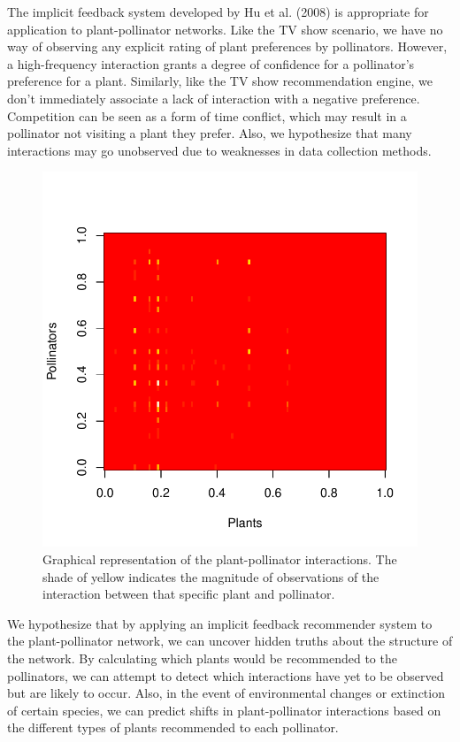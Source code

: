 \documentclass[twocolumn]{article}
\begin{document}
The implicit feedback system developed by Hu et al. (2008)\cite{hu2008collaborative} is appropriate for 
application to plant-pollinator networks. Like the TV show scenario, we have 
no way of observing any explicit rating of plant preferences by pollinators. 
However, a high-frequency interaction grants a degree of confidence for a pollinator's
preference for a plant.
Similarly, like the TV show recommendation engine, we don't immediately associate a lack of interaction
with a negative preference. Competition can be seen as a form of time conflict, which may result
in a pollinator not visiting a plant they prefer. Also, we hypothesize that many interactions
may go unobserved due to weaknesses in data collection methods.
\begin{figure}
  \caption{Graphical representation of the plant-pollinator interactions. The shade of yellow indicates the 
  magnitude of observations of the interaction between that specific plant and pollinator.}
  \centering
  \includegraphics[scale=0.5]{fullMat.pdf}
\end{figure}

We hypothesize that by applying an implicit feedback recommender system to the plant-pollinator network,
we can uncover hidden truths about the structure of the network. By calculating which plants would be
recommended to the pollinators, we can attempt to detect which interactions have yet to be observed but 
are likely to occur. Also,
in the event of environmental changes or extinction of certain species, we can predict  shifts in
plant-pollinator interactions based on the different types of plants recommended to each pollinator.
\end{document}
